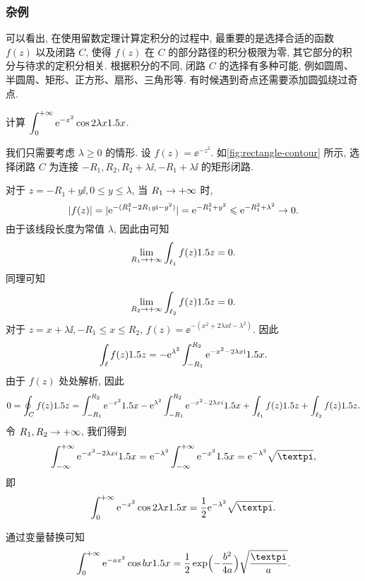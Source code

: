 \subsubsection{杂例\optional}

可以看出, 在使用留数定理计算定积分的过程中, 最重要的是选择合适的函数 $f(z)$ 以及闭路 $C$, 使得 $f(z)$ 在 $C$ 的部分路径的积分极限为零, 其它部分的积分与待求的定积分相关.
根据积分的不同, 闭路 $C$ 的选择有多种可能, 例如圆周、半圆周、矩形、正方形、扇形、三角形等.
有时候遇到奇点还需要添加圆弧绕过奇点.

\begin{example}
  计算 $\displaystyle\int_0^{+\infty}\mathrm{e}^{-x^2}\cos{2\lambda x}1.5 x$.
\end{example}

\begin{solution}
  我们只需要考虑 $\lambda \ge 0$ 的情形.
  设 $f(z)=\ee^{-z^2}$.
  如\ref{fig:rectangle-contour} 所示, 选择闭路 $C$ 为连接 $-R_1,R_2,R_2+\lambda \ii,-R_1+\lambda \ii$ 的矩形闭路.

  对于 $z=-R_1+y\ii,0\le y\le \lambda$, 当 $R_1\rightarrow+\infty$ 时,
  \[
    \lvert f(z)\rvert=\lvert\mathrm{e}^{-(R_1^2-2R_1y\mathrm{i}-y^2)}\rvert
    =\mathrm{e}^{-R_1^2+y^2}\leqslant \mathrm{e}^{-R_1^2+\lambda^2}\rightarrow0.
  \]
  由于该线段长度为常值 $\lambda$, 因此由\thmGrowUp 可知
  \[
    \lim_{R_1\rightarrow+\infty}\int_{\ell_1}f(z)1.5 z=0.
  \]
  同理可知
  \[
    \lim_{R_2\rightarrow+\infty}\int_{\ell_2}f(z)1.5 z=0.
  \]
  对于 $z=x+\lambda \ii,-R_1\le x\le R_2$, $f(z)=\ee^{-(x^2+2\lambda x\ii-\lambda^2)}$.
  因此
  \[
    \int_\ell f(z)1.5 z
    =-\mathrm{e}^{\lambda^2}\int_{-R_1}^{R_2} \mathrm{e}^{-x^2-2\lambda x\mathrm{i}}1.5 x.
  \]
  由于 $f(z)$ 处处解析, 因此
  \[
     0
    =\oint_C f(z)1.5 z
    =\int_{-R_1}^{R_2} \mathrm{e}^{-x^2}1.5 x
    -\mathrm{e}^{\lambda^2}\int_{-R_1}^{R_2} \mathrm{e}^{-x^2-2\lambda xi}1.5 x
    +\int_{\ell_1}f(z)1.5 z
    +\int_{\ell_2}f(z)1.5 z.
  \]
  令 $R_1,R_2\rightarrow+\infty$, 我们得到
  \[
    \intff \ee^{-x^2-2\lambda xi}\d x
    =\ee^{-\lambda^2}\intff \ee^{-x^2}\d x
    =\ee^{-\lambda^2}\sqrt\cpi,
  \]
  即
  \[
    \intf \ee^{-x^2}\cos{2\lambda x}\d x
    =\frac12\ee^{-\lambda^2}\sqrt\cpi.
  \]
\end{solution}
通过变量替换可知
\begin{equation}\label{eq:exp-cos-integral}
  \intf \ee^{-ax^2}\cos{bx}\d x
  =\frac12\exp\Bigl(-\frac{b^2}{4a}\Bigr)\sqrt\frac\cpi a.
\end{equation}

